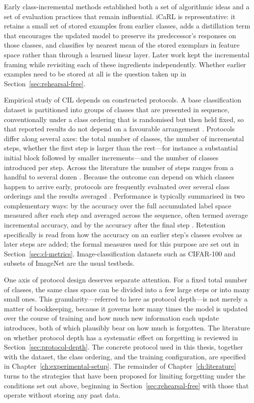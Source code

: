 Early class-incremental methods established both a set of algorithmic ideas
and a set of evaluation practices that remain influential. iCaRL \parencite{rebuffi2017icarl} is
representative: it retains a small set of stored examples from earlier
classes, adds a distillation term that encourages the updated model to
preserve its predecessor's responses on those classes, and classifies by
nearest mean of the stored exemplars in feature space rather than through a
learned linear layer. Later work kept the incremental framing while
revisiting each of these ingredients independently. Whether earlier
examples need to be stored at all is the question taken up in Section~\ref{sec:rehearsal-free}.

Empirical study of CIL depends on constructed protocols. A base
classification dataset is partitioned into groups of classes that are
presented in sequence, conventionally under a class ordering that is
randomised but then held fixed, so that reported results do not depend on a
favourable arrangement \parencite{rebuffi2017icarl,masana2020classincremental}.
Protocols differ along several axes: the total number of classes, the
number of incremental steps, whether the first step is larger than the
rest---for instance a substantial initial block followed by smaller
increments---and the number of classes introduced per step. Across the
literature the number of steps ranges from a handful to several dozen
\parencite{masana2020classincremental}. Because the outcome can depend on which classes
happen to arrive early, protocols are frequently evaluated over several
class orderings and the results averaged \parencite{masana2020classincremental}. Performance
is typically summarised in two complementary ways: by the accuracy over the
full accumulated label space measured after each step and averaged across
the sequence, often termed average incremental accuracy, and by the
accuracy after the final step \parencite{masana2020classincremental}. Retention specifically
is read from how the accuracy on an earlier step's classes evolves as later
steps are added; the formal measures used for this purpose are set out in
Section~\ref{sec:cl-metrics}. Image-classification datasets such as CIFAR-100 and subsets
of ImageNet are the usual testbeds.

One axis of protocol design deserves separate attention. For a fixed total
number of classes, the same class space can be divided into a few large
steps or into many small ones. This granularity---referred to here as
protocol depth---is not merely a matter of bookkeeping, because it governs
how many times the model is updated over the course of training and how
much new information each update introduces, both of which plausibly bear
on how much is forgotten. The literature on whether protocol depth has a systematic effect on
forgetting is reviewed in Section~\ref{sec:protocol-depth}. The concrete protocol used in
this thesis, together with the dataset, the class ordering, and the
training configuration, are specified in Chapter~\ref{ch:experimental-setup}. The remainder of
Chapter~\ref{ch:literature} turns to the strategies that have been proposed for limiting
forgetting under the conditions set out above, beginning in Section~\ref{sec:rehearsal-free}
with those that operate without storing any past data.

